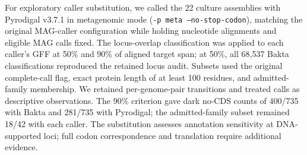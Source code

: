 For exploratory caller substitution, we called the 22 culture assemblies with Pyrodigal v3.7.1 in metagenomic mode (\texttt{-p meta --no-stop-codon}), matching the original MAG-caller configuration while holding nucleotide alignments and eligible MAG calls fixed. The locus-overlap classification was applied to each caller's GFF at 50\% and 90\% of aligned target span; at 50\%, all 68{,}537 Bakta classifications reproduced the retained locus audit. Subsets used the original complete-call flag, exact protein length of at least 100 residues, and admitted-family membership. We retained per-genome-pair transitions and treated calls as descriptive observations. The 90\% criterion gave dark no-CDS counts of 400/735 with Bakta and 281/735 with Pyrodigal; the admitted-family subset remained 18/42 with each caller. The substitution assesses annotation sensitivity at DNA-supported loci; full codon correspondence and translation require additional evidence.

